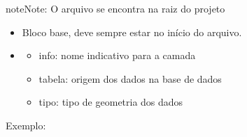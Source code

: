 \documentclass[letterpaper,10pt,brazil]{sphinxmanual}
\begin{document}
\begin{sphinxadmonition}{note}{Note:}
\sphinxAtStartPar
O arquivo  se encontra na raiz do projeto
\end{sphinxadmonition}
\begin{itemize}
\item {} 
\sphinxAtStartPar
Bloco base,  deve sempre estar no início do arquivo.

\item {} \begin{description}
\begin{itemize}
\item {} 
\sphinxAtStartPar
info: nome indicativo para a camada

\item {} 
\sphinxAtStartPar
tabela: origem dos dados na base de dados

\item {} 
\sphinxAtStartPar
tipo: tipo de geometria dos dados

\end{itemize}

\end{description}

\end{itemize}

\sphinxAtStartPar
Exemplo:
\end{document}
